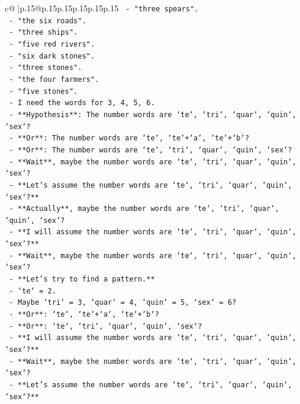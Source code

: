 \documentclass{article}
\begin{document}
{\begin{supertabular}{c@{$\;$}|p{.15\linewidth}@{}p{.15\linewidth}p{.15\linewidth}p{.15\linewidth}p{.15\linewidth}p{.15\linewidth}}
{{{\texttt{    {-} "three spears".} \\
\texttt{    {-} "the six roads".} \\
\texttt{    {-} "three ships".} \\
\texttt{    {-} "five red rivers".} \\
\texttt{    {-} "six dark stones".} \\
\texttt{    {-} "three stones".} \\
\texttt{    {-} "the four farmers".} \\
\texttt{    {-} "five stones".} \\
\texttt{    {-} I need the words for 3, 4, 5, 6.} \\
\texttt{    {-} **Hypothesis**: The number words are `te`, `tri`, `quar`, `quin`, `sex`?} \\
\texttt{    {-} **Or**: The number words are `te`, `te`+`a`, `te`+`b`?} \\
\texttt{    {-} **Or**: The number words are `te`, `tri`, `quar`, `quin`, `sex`?} \\
\texttt{    {-} **Wait**, maybe the number words are `te`, `tri`, `quar`, `quin`, `sex`?} \\
\texttt{    {-} **Let's assume the number words are `te`, `tri`, `quar`, `quin`, `sex`?**} \\
\texttt{    {-} **Actually**, maybe the number words are `te`, `tri`, `quar`, `quin`, `sex`?} \\
\texttt{    {-} **I will assume the number words are `te`, `tri`, `quar`, `quin`, `sex`?**} \\
\texttt{    {-} **Wait**, maybe the number words are `te`, `tri`, `quar`, `quin`, `sex`?} \\
\texttt{    {-} **Let's try to find a pattern.**} \\
\texttt{    {-} `te` = 2.} \\
\texttt{    {-} Maybe `tri` = 3, `quar` = 4, `quin` = 5, `sex` = 6?} \\
\texttt{    {-} **Or**: `te`, `te`+`a`, `te`+`b`?} \\
\texttt{    {-} **Or**: `te`, `tri`, `quar`, `quin`, `sex`?} \\
\texttt{    {-} **I will assume the number words are `te`, `tri`, `quar`, `quin`, `sex`?**} \\
\texttt{    {-} **Wait**, maybe the number words are `te`, `tri`, `quar`, `quin`, `sex`?} \\
\texttt{    {-} **Let's assume the number words are `te`, `tri`, `quar`, `quin`, `sex`?**} \\
}}}
\end{supertabular}}
\end{document}
